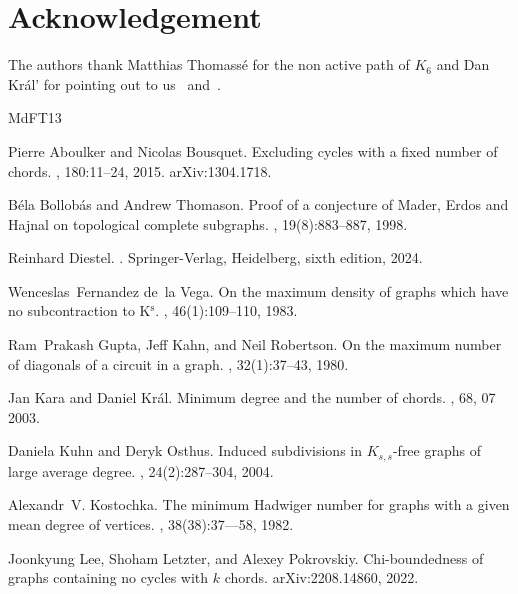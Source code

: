 \documentclass[11pt]{article}
\begin{document}
\section*{Acknowledgement}

The authors thank Matthias Thomassé for the non active path of $K_6$ and Dan Kr\'al' for pointing out to us~\cite{GUPTA198037} and~\cite{kral03}.

%
%

\begin{thebibliography}{MdFT13}

Pierre Aboulker and Nicolas Bousquet.
\newblock Excluding cycles with a fixed number of chords.
, 180:11--24, 2015.
\newblock arXiv:1304.1718.

B\'ela Bollob\'as and Andrew Thomason.
\newblock Proof of a conjecture of {M}ader, {E}rdos and {H}ajnal on topological
  complete subgraphs.
, 19(8):883--887, 1998.

Reinhard Diestel.
.
\newblock Springer-Verlag, Heidelberg, sixth edition, 2024.

Wenceslas~Fernandez de~la Vega.
\newblock On the maximum density of graphs which have no subcontraction to
  {K}\({}^{\mbox{s}}\).
, 46(1):109--110, 1983.

Ram~Prakash Gupta, Jeff Kahn, and Neil Robertson.
\newblock On the maximum number of diagonals of a circuit in a graph.
, 32(1):37--43, 1980.

Jan Kara and Daniel Král.
\newblock Minimum degree and the number of chords.
, 68, 07 2003.

Daniela Kuhn and Deryk Osthus.
\newblock Induced subdivisions in $K_{s, s}$-free graphs of large average degree.
, 24(2):287--304, 2004.

Alexandr~V. Kostochka.
\newblock The minimum {H}adwiger number for graphs with a given mean degree of
  vertices.
, 38(38):37–--58, 1982.

Joonkyung Lee, Shoham Letzter, and Alexey Pokrovskiy.
\newblock Chi-boundedness of graphs containing no cycles with $k$ chords.
\newblock arXiv:2208.14860, 2022.


\end{thebibliography}
\end{document}
